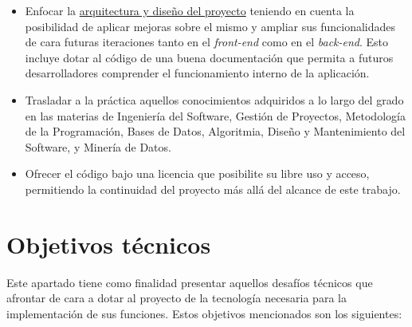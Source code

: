 \begin{itemize} [\textbullet]
\item Enfocar la \hyperref[sec:arquitectura]{arquitectura y diseño del proyecto} teniendo en cuenta la posibilidad de aplicar mejoras sobre el mismo y ampliar sus funcionalidades de cara futuras iteraciones tanto en el \emph{front-end} como en el \emph{back-end}. Esto incluye dotar al código de una buena documentación que permita a futuros desarrolladores comprender el funcionamiento interno de la aplicación.
\item Trasladar a la práctica aquellos conocimientos adquiridos a lo largo del grado en las materias de Ingeniería del Software, Gestión de Proyectos, Metodología de la Programación, Bases de Datos, Algoritmia, Diseño y Mantenimiento del Software, y Minería de Datos.
\item Ofrecer el código bajo una licencia que posibilite su libre uso y acceso, permitiendo la continuidad del proyecto más allá del alcance de este trabajo.

\end{itemize}

\bigskip

\section{Objetivos técnicos}

Este apartado tiene como finalidad presentar aquellos desafíos técnicos que afrontar de cara a dotar al proyecto de la tecnología necesaria para la implementación de sus funciones. Estos objetivos mencionados son los siguientes:


